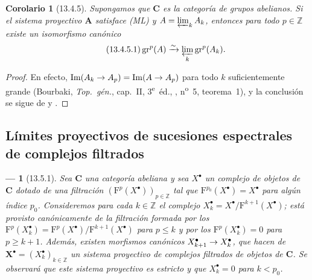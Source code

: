 \documentclass[10pt,oneside,openany]{book}
\theoremstyle{egaenv}\newtheorem*{env}{---}
\theoremstyle{egastatement}
\newtheorem*{corollary}{Corolario}
\theoremstyle{egadescription}
\renewcommand{\leq}{\leqslant}
\renewcommand{\geq}{\geqslant}
\renewcommand{\to}{\mathchoice{\longrightarrow}{\rightarrow}{\rightarrow}{\rightarrow}}
\begin{document}
\begin{corollary}[13.4.5]
\label{0.13.4.5}
\label{0.13.4.5-fr}
Supongamos que $\boldsymbol{C}$ es la categoría de grupos abelianos.
Si el sistema proyectivo $\mathbf A$ satisface \textup{(ML)} y
$A=\varprojlim_k A_k$, entonces para todo $p\in\mathbb Z$ existe un
isomorfismo canónico
\begin{equation}
\label{0.13.4.5.1-fr}
\tag{13.4.5.1}
\operatorname{gr}^p(A)\xrightarrow{\sim}
\varprojlim_k\operatorname{gr}^p(A_k).
\end{equation}
\end{corollary}

\begin{proof}
En efecto,
$\operatorname{Im}(A_k\to A_p)=\operatorname{Im}(A\to A_p)$
para todo $k$ suficientemente grande
(Bourbaki, \emph{Top.\ g\'{e}n.}, cap.~II,
3\textsuperscript{e}~\'{e}d., ,
n\textsuperscript{o}~5, teorema~1), y la conclusión se sigue de
 y .
\end{proof}

\subsection{Límites proyectivos de sucesiones espectrales de complejos filtrados}
\label{subsection:0.13.5}
\label{subsection:0.13.5-fr}

\begin{env}[13.5.1]
\label{0.13.5.1}
\label{0.13.5.1-fr}
Sea $\boldsymbol{C}$ una categoría abeliana y sea $X^\bullet$ un complejo
de objetos de $\boldsymbol{C}$ dotado de una filtración
$(\mathrm F^p(X^\bullet))_{p\in\mathbb Z}$ tal que
$\mathrm F^{p_0}(X^\bullet)=X^\bullet$ para algún índice $p_0$. Consideremos para cada $k\in\mathbb Z$ el complejo $X_k^\bullet=X^\bullet/\mathrm F^{k+1}(X^\bullet)$; está provisto canónicamente de la filtración formada por los $\mathrm F^p(X_k^\bullet)=
\mathrm F^p(X^\bullet)/\mathrm F^{k+1}(X^\bullet)$ para $p\leq k$ y por los $\mathrm F^p(X_k^\bullet)=0$ para $p\geq k+1$.
Además, existen morfismos canónicos
$X_{k+1}^\bullet\to X_k^\bullet$, que hacen de
$\mathbf X^\bullet=(X_k^\bullet)_{k\in\mathbb Z}$ un \emph{sistema proyectivo
de complejos filtrados de objetos de $\boldsymbol{C}$}.
Se observará que este sistema proyectivo es \emph{estricto} y que
$X_k^\bullet=0$ para $k<p_0$.
\end{env}
\end{document}

